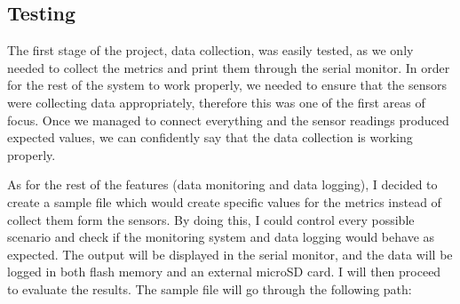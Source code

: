 \documentclass[12pt]{article}
\begin{document}
\subsection{Testing}

The first stage of the project, data collection, was easily tested, as we only needed to collect the metrics and print them through the serial monitor. In order for the rest of the system to work properly, we needed to ensure that the sensors were collecting data appropriately, therefore this was one of the first areas of focus. Once we managed to connect everything and the sensor readings produced expected values, we can confidently say that the data collection is working properly.\par

As for the rest of the features (data monitoring and data logging), I decided to create a sample file which would create specific values for the metrics instead of collect them form the sensors. By doing this, I could control every possible scenario and check if the monitoring system and data logging would behave as expected. The output will be displayed in the serial monitor, and the data will be logged in both flash memory and an external microSD card. I will then proceed to evaluate the results. The sample file will go through the following path:
\end{document}
